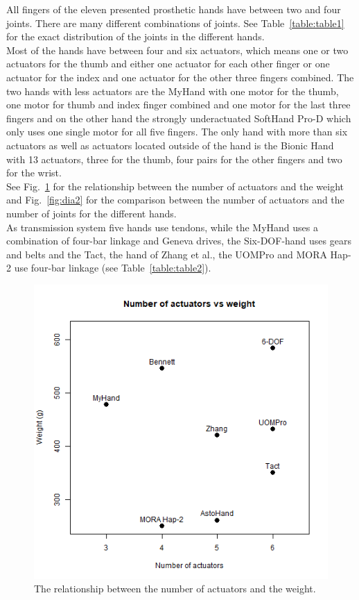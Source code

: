 \documentclass[a4paper, 10pt, conference]{ieeeconf}      %
\begin{document}
All fingers of the eleven presented prosthetic hands have between two and four joints. There are many different combinations of joints. See Table~\ref{table:table1} for the exact distribution of the joints in the different hands.\\
Most of the hands have between four and six actuators, which means one or two actuators for the thumb and either one actuator for each other finger or one actuator for the index and one actuator for the other three fingers combined. The two hands with less actuators are the MyHand with one motor for the thumb, one motor for thumb and index finger combined and one motor for the last three fingers and on the other hand the strongly underactuated SoftHand Pro-D which only uses one single motor for all five fingers. The only hand with more than six actuators as well as actuators located outside of the hand is the Bionic Hand with 13 actuators, three for the thumb, four pairs for the other fingers and two for the wrist.\\
See Fig.~\ref{fig:dia1} for the relationship between the number of actuators and the weight and Fig.~\ref{fig:dia2} for the comparison between the number of actuators and the number of joints for the different hands.\\
As transmission system five hands use tendons, while the MyHand uses a combination of four-bar linkage and Geneva drives, the Six-DOF-hand uses gears and belts and the Tact, the hand of Zhang et al., the UOMPro and MORA Hap-2 use four-bar linkage (see Table~\ref{table:table2}).

\begin{figure}[h]

	\centering
	\includegraphics[scale=0.4]{images/weight-act}
	
	\caption{The relationship between the number of actuators and the weight.}
	\label{fig:dia1}
\end{figure}
\end{document}
